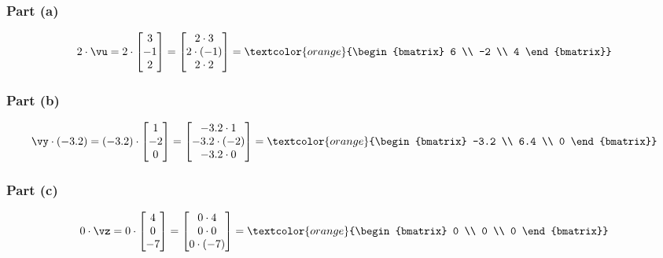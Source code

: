 \begin{sol}
    \subsubsection*{Part (a)}
    \[
    2 \cdot \vu = 2 \cdot \begin{bmatrix} 3 \\ -1 \\ 2 \end{bmatrix} = \begin{bmatrix} 2 \cdot 3 \\ 2 \cdot (-1) \\ 2 \cdot 2 \end{bmatrix} = \textcolor{orange}{\begin{bmatrix} 6 \\ -2 \\ 4 \end{bmatrix}}
    \]
    
    \subsubsection*{Part (b)}
    \[
    \vy \cdot (-3.2) = (-3.2) \cdot \begin{bmatrix} 1 \\ -2 \\ 0 \end{bmatrix} = \begin{bmatrix} -3.2 \cdot 1 \\ -3.2 \cdot (-2) \\ -3.2 \cdot 0 \end{bmatrix} = \textcolor{orange}{\begin{bmatrix} -3.2 \\ 6.4 \\ 0 \end{bmatrix}}
    \]
    
    \subsubsection*{Part (c)}
    \[
    0 \cdot \vz = 0 \cdot \begin{bmatrix} 4 \\ 0 \\ -7 \end{bmatrix} = \begin{bmatrix} 0 \cdot 4 \\ 0 \cdot 0 \\ 0 \cdot (-7) \end{bmatrix} = \textcolor{orange}{\begin{bmatrix} 0 \\ 0 \\ 0 \end{bmatrix}}
    \]
\end{sol}

